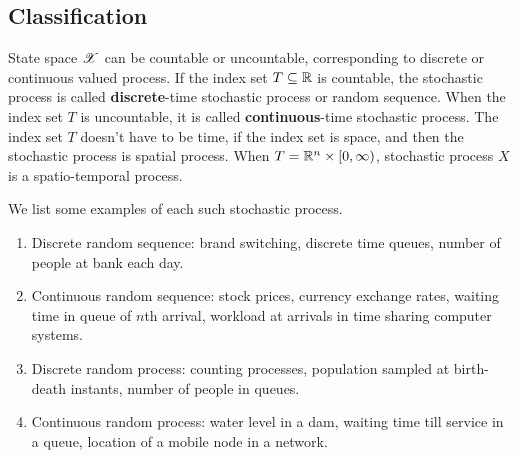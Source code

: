 \documentclass[letterpaper,10pt,english]{article}
\begin{document}
\subsection{Classification}
State space $\mathscr{X}$ can be countable or uncountable, corresponding to discrete or continuous valued process.  
If the index set $T \subseteq \mathbb{R}$ is countable, the stochastic process is called \textbf{discrete}-time stochastic process or random sequence. 
When the index set $T$ is uncountable, it is called \textbf{continuous}-time stochastic process. 
The index set $T$ doesn't have to be time, if the index set is space, and then the stochastic process is spatial process. 
When $T = \mathbb{R}^n \times [0, \infty)$, stochastic process $X$ is a spatio-temporal process. 
\begin{shaded}
\begin{exmp}
We list some examples of each such stochastic process. 
\begin{enumerate}[i\_]
\item Discrete random sequence: brand switching, discrete time queues, number of people at bank each day.
\item Continuous random sequence: stock prices, currency exchange rates, waiting time in queue of $n$th arrival, workload at arrivals in time sharing computer systems.
\item Discrete random process:  counting processes, population sampled at birth-death instants, number of people in queues.
\item Continuous random process: water level in a dam, waiting time till service in a queue, location of a mobile node in a network.
\end{enumerate}
\end{exmp}
\end{shaded}
\end{document}
